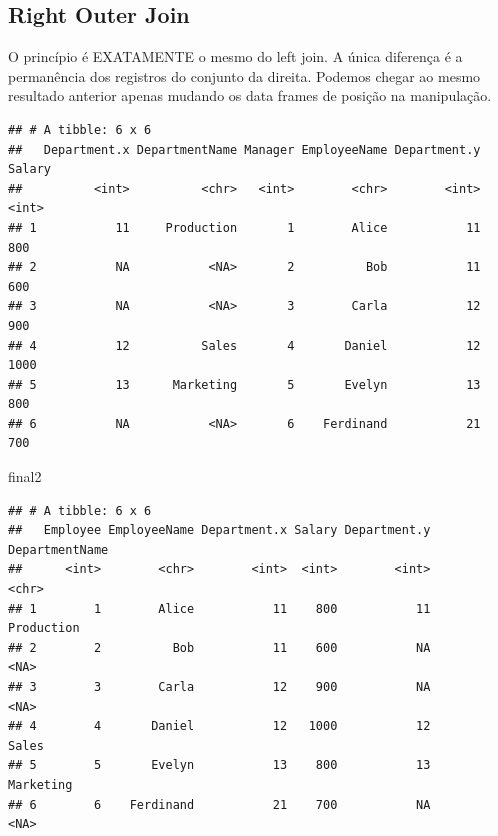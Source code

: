 \documentclass[]{book}
\newenvironment{Shaded}{\begin{snugshade}}{\end{snugshade}}
\newcommand{\KeywordTok}[1]{\textcolor[rgb]{0.13,0.29,0.53}{\textbf{#1}}}
\newcommand{\DataTypeTok}[1]{\textcolor[rgb]{0.13,0.29,0.53}{#1}}
\newcommand{\StringTok}[1]{\textcolor[rgb]{0.31,0.60,0.02}{#1}}
\newcommand{\OperatorTok}[1]{\textcolor[rgb]{0.81,0.36,0.00}{\textbf{#1}}}
\newcommand{\NormalTok}[1]{#1}
\begin{document}
\subsection{Right Outer Join}\label{right-outer-join}

O princípio é EXATAMENTE o mesmo do left join. A única diferença é a
permanência dos registros do conjunto da direita. Podemos chegar ao
mesmo resultado anterior apenas mudando os data frames de posição na
manipulação.

\begin{Shaded}
\end{Shaded}

\begin{verbatim}
## # A tibble: 6 x 6
##   Department.x DepartmentName Manager EmployeeName Department.y Salary
##          <int>          <chr>   <int>        <chr>        <int>  <int>
## 1           11     Production       1        Alice           11    800
## 2           NA           <NA>       2          Bob           11    600
## 3           NA           <NA>       3        Carla           12    900
## 4           12          Sales       4       Daniel           12   1000
## 5           13      Marketing       5       Evelyn           13    800
## 6           NA           <NA>       6    Ferdinand           21    700
\end{verbatim}

\begin{Shaded}
\begin{Highlighting}[]
\NormalTok{final2}
\end{Highlighting}
\end{Shaded}

\begin{verbatim}
## # A tibble: 6 x 6
##   Employee EmployeeName Department.x Salary Department.y DepartmentName
##      <int>        <chr>        <int>  <int>        <int>          <chr>
## 1        1        Alice           11    800           11     Production
## 2        2          Bob           11    600           NA           <NA>
## 3        3        Carla           12    900           NA           <NA>
## 4        4       Daniel           12   1000           12          Sales
## 5        5       Evelyn           13    800           13      Marketing
## 6        6    Ferdinand           21    700           NA           <NA>
\end{verbatim}
\end{document}
